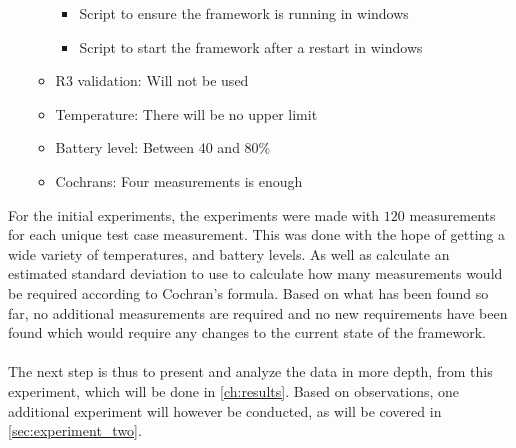 \begin{itemize}
\begin{itemize}
\begin{itemize}
            \item Script to ensure the framework is running in windows
            \item Script to start the framework after a restart in windows
        \end{itemize}
        \item R3 validation: Will not be used
        \item Temperature: There will be no upper limit
        \item Battery level: Between 40 and 80\%
        \item Cochrans: Four measurements is enough
    \end{itemize}
\end{itemize}

For the initial experiments, the experiments were made with $120$ measurements for each unique test case measurement. This was done with the hope of getting a wide variety of temperatures, and battery levels. As well as calculate an estimated standard deviation to use to calculate how many measurements would be required according to Cochran's formula. Based on what has been found so far, no additional measurements are required and no new requirements have been found which would require any changes to the current state of the framework.

\paragraph*{}
The next step is thus to present and analyze the data in more depth, from this experiment, which will be done in \cref{ch:results}. Based on observations, one additional experiment will however be conducted, as will be covered in \cref{sec:experiment_two}.